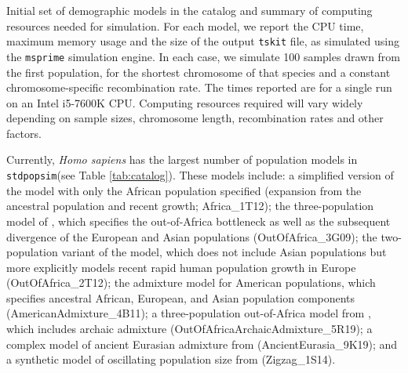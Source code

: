 \documentclass[12pt,halfline,a4paper]{ouparticle}
\newcommand{\stdpopsim}{\texttt{stdpopsim}\xspace}
\newcommand{\tskit}{\texttt{tskit}\xspace}
\begin{document}
\renewcommand{\arraystretch}{1.2}
\begin{table}[t]
\makebox[\textwidth][c]{
    \begin{footnotesize}
    
    \end{footnotesize}
}
\caption{\label{tab:catalog}
Initial set of demographic models in the catalog and summary of computing resources needed for simulation.
For each model, we report the CPU time, maximum memory usage and the
size of the output \tskit file, as simulated using the \texttt{msprime} simulation engine.
In each case, we simulate 100 samples
drawn from the first population, for the shortest chromosome of that species
and a constant chromosome-specific recombination rate.
The times reported are for a single run on an Intel i5-7600K CPU.
Computing resources required will vary widely depending on sample sizes, chromosome length,
recombination rates and other factors.
}
\end{table}

Currently, {\em Homo sapiens} has the largest number of population models in
\stdpopsim (see Table \ref{tab:catalog}).
These models include: a simplified version of the \cite{tennessen2012evolution}
model with only the African population specified (expansion from the ancestral
population and recent growth; Africa\_1T12); the three-population model of \cite{gutenkunst2009inferring},
which specifies the out-of-Africa bottleneck as well as the subsequent divergence of
the European and Asian populations (OutOfAfrica\_3G09); the \cite{tennessen2012evolution} two-population variant of the
\citeauthor{gutenkunst2009inferring} model, which does not include Asian populations but more explicitly models
recent rapid human population growth in Europe (OutOfAfrica\_2T12); the \cite{browning2018ancestry} admixture model
for American populations, which specifies ancestral African, European, and Asian population
components (AmericanAdmixture\_4B11); a three-population out-of-Africa model from \cite{ragsdale2019models},
which includes archaic admixture (OutOfAfricaArchaicAdmixture\_5R19);
a complex model of ancient Eurasian admixture from \cite{kamm2019efficiently} (AncientEurasia\_9K19);
and a synthetic model of oscillating population size from \cite{schiffels2014inferring} (Zigzag\_1S14).
\end{document}
